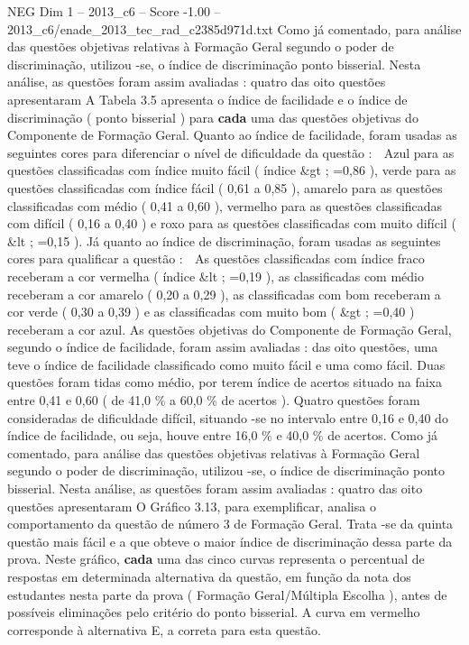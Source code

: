 \begin{textsample}{NEG Dim 1 – 2013\_c6 – Score -1.00 – 2013\_c6/enade\_2013\_tec\_rad\_c2385d971d.txt}
Como já comentado, para análise das questões objetivas relativas à Formação Geral segundo o poder de discriminação, utilizou -se, o índice de discriminação ponto bisserial.
Nesta análise, as questões foram assim avaliadas : quatro das oito questões apresentaram A Tabela 3.5 apresenta o índice de facilidade e o índice de discriminação ( ponto bisserial ) para \textbf{cada} uma das questões objetivas do Componente de Formação Geral.
Quanto ao índice de facilidade, foram usadas as seguintes cores para diferenciar o nível de dificuldade da questão :  Azul para as questões classificadas com índice muito fácil ( índice \&gt ; =0,86 ), verde para as questões classificadas com índice fácil ( 0,61 a 0,85 ), amarelo para as questões classificadas com médio ( 0,41 a 0,60 ), vermelho para as questões classificadas com difícil ( 0,16 a 0,40 ) e roxo para as questões classificadas com muito difícil ( \&lt ; =0,15 ).
Já quanto ao índice de discriminação, foram usadas as seguintes cores para qualificar a questão :  As questões classificadas com índice fraco receberam a cor vermelha ( índice \&lt ; =0,19 ), as classificadas com médio receberam a cor amarelo ( 0,20 a 0,29 ), as classificadas com bom receberam a cor verde ( 0,30 a 0,39 ) e as classificadas com muito bom ( \&gt ; =0,40 ) receberam a cor azul.
As questões objetivas do Componente de Formação Geral, segundo o índice de facilidade, foram assim avaliadas : das oito questões, uma teve o índice de facilidade classificado como muito fácil e uma como fácil.
Duas questões foram tidas como médio, por terem índice de acertos situado na faixa entre 0,41 e 0,60 ( de 41,0 \% a 60,0 \% de acertos ).
Quatro questões foram consideradas de dificuldade difícil, situando -se no intervalo entre 0,16 e 0,40 do índice de facilidade, ou seja, houve entre 16,0 \% e 40,0 \% de acertos.
Como já comentado, para análise das questões objetivas relativas à Formação Geral segundo o poder de discriminação, utilizou -se, o índice de discriminação ponto bisserial.
Nesta análise, as questões foram assim avaliadas : quatro das oito questões apresentaram O Gráfico 3.13, para exemplificar, analisa o comportamento da questão de número 3 de Formação Geral.
Trata -se da quinta questão mais fácil e a que obteve o maior índice de discriminação dessa parte da prova.
Neste gráfico, \textbf{cada} uma das cinco curvas representa o percentual de respostas em determinada alternativa da questão, em função da nota dos estudantes nesta parte da prova ( Formação Geral/Múltipla Escolha ), antes de possíveis eliminações pelo critério do ponto bisserial.
A curva em vermelho corresponde à alternativa E, a correta para esta questão.

\end{textsample}
